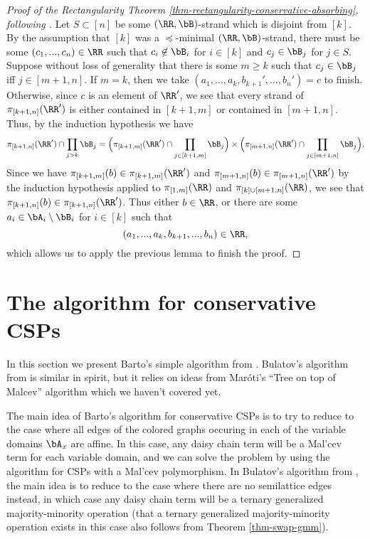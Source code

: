 \begin{proof}[Proof of the Rectangularity Theorem \ref{thm-rectangularity-conservative-absorbing}, following \cite{barto-conservative-revisited}]
Let $S \subset [n]$ be some $(\RR,\bB)$-strand which is disjoint from $[k]$. By the assumption that $[k]$ was a $\preceq$-minimal $(\RR,\bB)$-strand, there must be some $(c_1, ..., c_n) \in \RR$ such that $c_i \not\in \bB_i$ for $i \in [k]$ and $c_j \in \bB_j$ for $j \in S$. Suppose without loss of generality that there is some $m \ge k$ such that $c_j \in \bB_j$ iff $j \in [m+1,n]$. If $m = k$, then we take $(a_1, ..., a_k, b_{k+1}', ..., b_n') = c$ to finish. Otherwise, since $c$ is an element of $\RR'$, we see that every strand of $\pi_{[k+1,n]}(\RR')$ is either contained in $[k+1,m]$ or contained in $[m+1,n]$. Thus, by the induction hypothesis we have
\[
\pi_{[k+1,n]}(\RR') \cap \prod_{j > k} \bB_j = \Big(\pi_{[k+1,m]}(\RR') \cap \prod_{j \in [k+1,m]} \bB_j \Big) \times \Big(\pi_{[m+1,n]}(\RR') \cap \prod_{j \in [m+1,n]} \bB_j \Big).
\]
Since we have $\pi_{[k+1,m]}(b) \in \pi_{[k+1,m]}(\RR')$ and $\pi_{[m+1,n]}(b) \in \pi_{[m+1,n]}(\RR')$ by the induction hypothesis applied to $\pi_{[1,m]}(\RR)$ and $\pi_{[k]\cup [m+1,n]}(\RR)$, we see that $\pi_{[k+1,n]}(b) \in \pi_{[k+1,n]}(\RR')$. Thus either $b \in \RR$, or there are some $a_i \in \bA_i \setminus \bB_i$ for $i \in [k]$ such that
\[
(a_1, ..., a_k, b_{k+1}, ..., b_n) \in \RR,
\]
which allows us to apply the previous lemma to finish the proof.
\end{proof}


\section{The algorithm for conservative CSPs}

In this section we present Barto's simple algorithm from \cite{barto-conservative-revisited}. Bulatov's algorithm from \cite{bulatov-conservative-rerevisited} is similar in spirit, but it relies on ideas from Mar\'oti's ``Tree on top of Malcev'' algorithm \cite{tree-on-top-of-malcev} which we haven't covered yet.

The main idea of Barto's algorithm for conservative CSPs is to try to reduce to the case where all edges of the colored graphs occuring in each of the variable domains $\bA_x$ are affine. In this case, any daisy chain term will be a Mal'cev term for each variable domain, and we can solve the problem by using the algorithm for CSPs with a Mal'cev polymorphism. In Bulatov's algorithm from \cite{bulatov-conservative-rerevisited}, the main idea is to reduce to the case where there are no semilattice edges instead, in which case any daisy chain term will be a ternary generalized majority-minority operation (that a ternary generalized majority-minority operation exists in this case also follows from Theorem \ref{thm-swap-gmm}).

